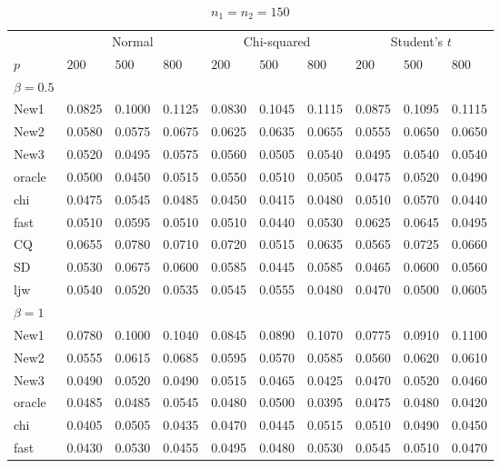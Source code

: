 \documentclass[review]{elsarticle}
\theoremstyle{plain}
\theoremstyle{definition}
\theoremstyle{remark}
\begin{document}
\begin{table}[ht]
\caption{$n_1=n_2=150$} 
\label{hahaha}
\vspace{3mm}
\centering
\begin{tabular}{llllllllll}
\toprule
    &   \multicolumn{3}{c}{Normal} & \multicolumn{3}{c}{Chi-squared}& \multicolumn{3}{c}{Student's $t$}  \\
    \cmidrule(r){2-4}
\cmidrule(r){5-7}
\cmidrule(r){8-10}
    $p$ & $200$ &  $500$ & $800$ & $200$  & $500$ & $800$ & $200$ & $500$ & $800$ \\ 
\midrule
    $\beta=0.5$\\
New1 & 0.0825 & 0.1000 & 0.1125 & 0.0830 & 0.1045 & 0.1115 & 0.0875 & 0.1095 & 0.1115 \\ 
New2 & 0.0580 & 0.0575 & 0.0675 & 0.0625 & 0.0635 & 0.0655 & 0.0555 & 0.0650 & 0.0650 \\ 
New3 & 0.0520 & 0.0495 & 0.0575 & 0.0560 & 0.0505 & 0.0540 & 0.0495 & 0.0540 & 0.0540 \\ 
oracle & 0.0500 & 0.0450 & 0.0515 & 0.0550 & 0.0510 & 0.0505 & 0.0475 & 0.0520 & 0.0490 \\ 
chi & 0.0475 & 0.0545 & 0.0485 & 0.0450 & 0.0415 & 0.0480 & 0.0510 & 0.0570 & 0.0440 \\ 
fast & 0.0510 & 0.0595 & 0.0510 & 0.0510 & 0.0440 & 0.0530 & 0.0625 & 0.0645 & 0.0495 \\ 
CQ & 0.0655 & 0.0780 & 0.0710 & 0.0720 & 0.0515 & 0.0635 & 0.0565 & 0.0725 & 0.0660 \\ 
SD & 0.0530 & 0.0675 & 0.0600 & 0.0585 & 0.0445 & 0.0585 & 0.0465 & 0.0600 & 0.0560 \\ 
ljw & 0.0540 & 0.0520 & 0.0535 & 0.0545 & 0.0555 & 0.0480 & 0.0470 & 0.0500 & 0.0605 \\ 
    $\beta=1$\\
New1 & 0.0780 & 0.1000 & 0.1040 & 0.0845 & 0.0890 & 0.1070 & 0.0775 & 0.0910 & 0.1100 \\ 
New2 & 0.0555 & 0.0615 & 0.0685 & 0.0595 & 0.0570 & 0.0585 & 0.0560 & 0.0620 & 0.0610 \\ 
New3 & 0.0490 & 0.0520 & 0.0490 & 0.0515 & 0.0465 & 0.0425 & 0.0470 & 0.0520 & 0.0460 \\ 
oracle & 0.0485 & 0.0485 & 0.0545 & 0.0480 & 0.0500 & 0.0395 & 0.0475 & 0.0480 & 0.0420 \\ 
chi & 0.0405 & 0.0505 & 0.0435 & 0.0470 & 0.0445 & 0.0515 & 0.0510 & 0.0490 & 0.0450 \\ 
fast & 0.0430 & 0.0530 & 0.0455 & 0.0495 & 0.0480 & 0.0530 & 0.0545 & 0.0510 & 0.0470 \\ 

\end{tabular}
\end{table}
\end{document}
